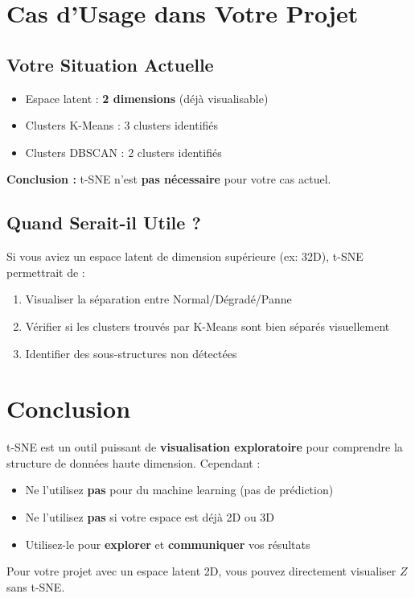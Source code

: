 \documentclass[a4paper,11pt]{article}
\begin{document}
\section{Cas d'Usage dans Votre Projet}

\subsection{Votre Situation Actuelle}

\begin{itemize}
    \item Espace latent : \textbf{2 dimensions} (déjà visualisable)
    \item Clusters K-Means : 3 clusters identifiés
    \item Clusters DBSCAN : 2 clusters identifiés
\end{itemize}

\textbf{Conclusion :} t-SNE n'est \textbf{pas nécessaire} pour votre cas actuel.

\subsection{Quand Serait-il Utile ?}

Si vous aviez un espace latent de dimension supérieure (ex: 32D), t-SNE permettrait de :
\begin{enumerate}
    \item Visualiser la séparation entre Normal/Dégradé/Panne
    \item Vérifier si les clusters trouvés par K-Means sont bien séparés visuellement
    \item Identifier des sous-structures non détectées
\end{enumerate}

\section{Conclusion}

t-SNE est un outil puissant de \textbf{visualisation exploratoire} pour comprendre la structure de données haute dimension. Cependant :

\begin{itemize}
    \item Ne l'utilisez \textbf{pas} pour du machine learning (pas de prédiction)
    \item Ne l'utilisez \textbf{pas} si votre espace est déjà 2D ou 3D
    \item Utilisez-le pour \textbf{explorer} et \textbf{communiquer} vos résultats
\end{itemize}

Pour votre projet avec un espace latent 2D, vous pouvez directement visualiser $Z$ sans t-SNE.
\end{document}

